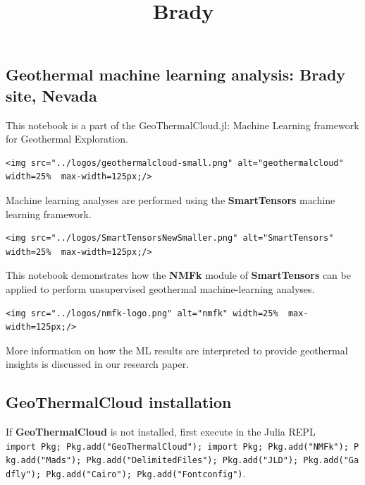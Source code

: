 \documentclass[11pt]{article}
\title{Brady}
\begin{document}
    
    \maketitle
    
    

    
    \hypertarget{geothermal-machine-learning-analysis-brady-site-nevada}{%
\subsection{Geothermal machine learning analysis: Brady site,
Nevada}\label{geothermal-machine-learning-analysis-brady-site-nevada}}

This notebook is a part of the GeoThermalCloud.jl: Machine Learning
framework for Geothermal Exploration.

\begin{verbatim}
<img src="../logos/geothermalcloud-small.png" alt="geothermalcloud" width=25%  max-width=125px;/>
\end{verbatim}

Machine learning analyses are performed using the \textbf{SmartTensors}
machine learning framework.

\begin{verbatim}
<img src="../logos/SmartTensorsNewSmaller.png" alt="SmartTensors" width=25%  max-width=125px;/>
\end{verbatim}

This notebook demonstrates how the \textbf{NMFk} module of
\textbf{SmartTensors} can be applied to perform unsupervised geothermal
machine-learning analyses.

\begin{verbatim}
<img src="../logos/nmfk-logo.png" alt="nmfk" width=25%  max-width=125px;/>
\end{verbatim}

More information on how the ML results are interpreted to provide
geothermal insights is discussed in our research paper.

    \hypertarget{geothermalcloud-installation}{%
\subsection{GeoThermalCloud
installation}\label{geothermalcloud-installation}}

If \textbf{GeoThermalCloud} is not installed, first execute in the Julia
REPL
\texttt{import\ Pkg;\ Pkg.add("GeoThermalCloud");\ import\ Pkg;\ Pkg.add("NMFk");\ Pkg.add("Mads");\ Pkg.add("DelimitedFiles");\ Pkg.add("JLD");\ Pkg.add("Gadfly");\ Pkg.add("Cairo");\ Pkg.add("Fontconfig")}.
\end{document}
